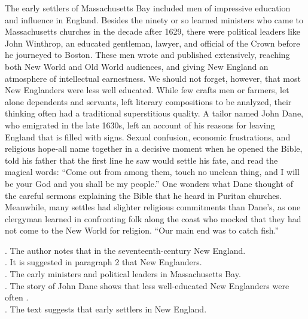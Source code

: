 The early settlers of Massachusetts Bay included men of impressive education and influence in England. Besides the ninety or so learned ministers who came to Massachusetts churches in the decade after 1629, there were political leaders like John Winthrop, an educated gentleman, lawyer, and official of the Crown before he journeyed to Boston. These men wrote and published extensively, reaching both New World and Old World audiences, and giving New England an atmosphere of intellectual earnestness.
We should not forget, however, that most New Englanders were less well educated. While few crafts men or farmers, let alone dependents and servants, left literary compositions to be analyzed, their thinking often had a traditional superstitious quality. A tailor named John Dane, who emigrated in the late 1630s, left an account of his reasons for leaving England that is filled with signs. Sexual confusion, economic frustrations, and religious hope-all name together in a decisive moment when he opened the Bible, told his father that the first line he saw would settle his fate, and read the magical words: “Come out from among them, touch no unclean thing, and I will be your God and you shall be my people.” One wonders what Dane thought of the careful sermons explaining the Bible that he heard in Puritan churches.
Meanwhile, many settles had slighter religious commitments than Dane’s, as one clergyman learned in confronting folk along the coast who mocked that they had not come to the New World for religion. “Our main end was to catch fish.”
\begin{questions} . The author notes that in the seventeenth-century New England\ltk{}.
\\ . It is suggested in paragraph 2 that New Englanders\ltk{}.
\\ . The early ministers and political leaders in Massachusetts Bay\ltk{}.
\\ . The story of John Dane shows that less well-educated New
Englanders were often \ltk{}.
\\ . The text suggests that early settlers in New England\ltk{}.
\\ \end{questions}    